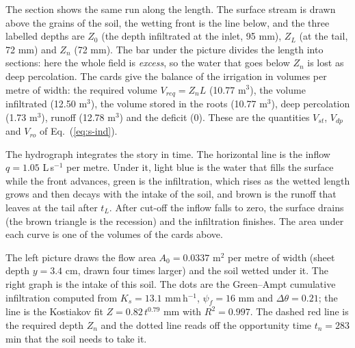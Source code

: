 
The section shows the same run along the length. The surface stream is drawn above the grains of the soil, the wetting front is the line below, and the three labelled depths are $Z_0$ (the depth infiltrated at the inlet, 95 mm), $Z_L$ (at the tail, 72 mm) and $Z_n$ (72 mm). The bar under the picture divides the length into sections: here the whole field is \emph{excess}, so the water that goes below $Z_n$ is lost as deep percolation. The cards give the balance of the irrigation in volumes per metre of width: the required volume $V_{req}=Z_nL$ (10.77 m$^3$), the volume infiltrated (12.50 m$^3$), the volume stored in the roots (10.77 m$^3$), deep percolation (1.73 m$^3$), runoff (12.78 m$^3$) and the deficit (0). These are the quantities $V_{st}$, $V_{dp}$ and $V_{ro}$ of Eq.~(\ref{eq:s-ind}).


The hydrograph integrates the story in time. The horizontal line is the inflow $q=1.05$ L\,s$^{-1}$ per metre. Under it, light blue is the water that fills the surface while the front advances, green is the infiltration, which rises as the wetted length grows and then decays with the intake of the soil, and brown is the runoff that leaves at the tail after $t_L$. After cut-off the inflow falls to zero, the surface drains (the brown triangle is the recession) and the infiltration finishes. The area under each curve is one of the volumes of the cards above.


The left picture draws the flow area $A_0=0.0337$ m$^2$ per metre of width (sheet depth $y=3.4$ cm, drawn four times larger) and the soil wetted under it. The right graph is the intake of this soil. The dots are the Green--Ampt cumulative infiltration computed from $K_s=13.1$ mm\,h$^{-1}$, $\psi_f=16$ mm and $\Delta\theta=0.21$; the line is the Kostiakov fit $Z=0.82\,t^{0.79}$ mm with $R^2=0.997$. The dashed red line is the required depth $Z_n$ and the dotted line reads off the opportunity time $t_n=283$ min that the soil needs to take it.

